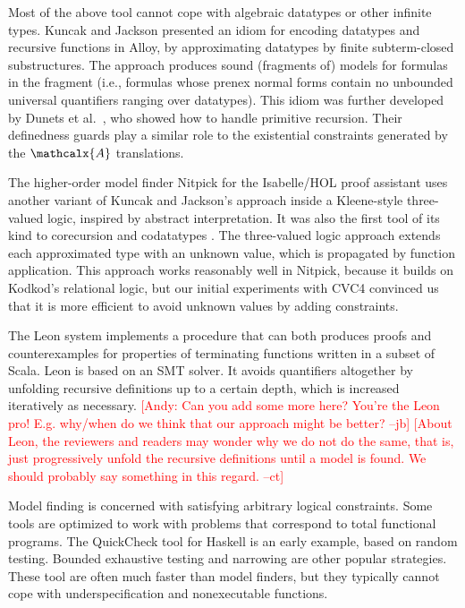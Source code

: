 \documentclass[runningheads,a4paper]{llncs}
\newcommand\cvc{CVC4\xspace}
\newcommand{\conv}{\mathcalx{A}}
\newcommand{\rem}[1]{\textcolor{red}{[#1]}}
\newcommand{\jb}[1]{\rem{#1 --jb}}
\newcommand{\ct}[1]{\rem{#1 --ct}}
\begin{document}
Most of the above tool cannot cope with algebraic datatypes or other infinite
types. Kuncak and Jackson \cite{kuncak-jackson-2005} presented an idiom for
encoding datatypes and recursive functions in Alloy, by approximating datatypes
by finite subterm-closed substructures. The approach produces sound (fragments
of) models for formulas in the  fragment
(i.e., formulas whose prenex normal forms contain no unbounded universal
quantifiers ranging over datatypes). This idiom was further developed by Dunets
et al.\ \cite{dunets-et-al-2010}, who showed how to handle primitive recursion.
Their definedness guards play a similar role to the existential constraints
generated by the $\conv$ translations.

The higher-order model finder Nitpick for the Isabelle/HOL proof assistant uses
another variant of Kuncak and Jackson's approach inside a Kleene-style
three-valued logic, inspired by abstract interpretation. It was also the first
tool of its kind to corecursion and codatatypes
\cite{blanchette-2013-relational}. The three-valued logic approach extends each
approximated type with an unknown value, which is propagated by function
application. This approach works reasonably well in Nitpick, because it builds
on Kodkod's relational logic, but our initial experiments with \cvc convinced
us that it is more efficient to avoid unknown values by adding constraints.

The Leon system \cite{suter-et-al-2011} implements a procedure that can both
produces proofs and counterexamples for properties of terminating functions
written in a subset of Scala. Leon is based on an SMT solver. It avoids
quantifiers altogether by unfolding recursive definitions up to a certain
depth, which is increased iteratively as necessary.
\jb{Andy: Can you add some more here? You're the Leon pro! E.g. why/when do we think
that our approach might be better?}
\ct{About Leon, the reviewers and readers may wonder why we do not do the same, that is, just progressively unfold the recursive definitions until a model is found.
We should probably say something in this regard.
}

Model finding is concerned with satisfying arbitrary logical constraints. Some
tools are optimized to work with problems that correspond to total functional
programs. The QuickCheck tool for Haskell \cite{claessen-hughes-2000} is an early example, based
on random testing. Bounded exhaustive testing \cite{runciman-et-al-2008} and
narrowing \cite{lindblad-2008-testing} are other popular strategies. These tool
are often much faster than model finders, but they typically cannot cope with
underspecification and nonexecutable functions.
\end{document}
